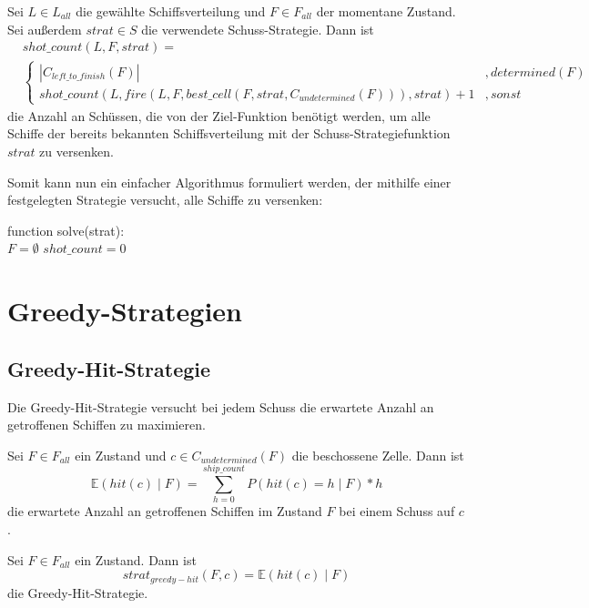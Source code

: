 \documentclass[a4paper,12pt]{llncs}
\numberwithin{equation}{section}
\begin{document}
\begin{definition}
Sei $L\in L_{all}$ die gewählte Schiffsverteilung und $F\in F_{all}$ der momentane Zustand.
Sei außerdem $strat \in S$ die verwendete Schuss-Strategie.
Dann ist
\begin{align}
&shot\_count(L, F, strat)=\\
& \begin{cases} 
  	|C_{left\_to\_finish}(F)|& ,determined(F) \\
      shot\_count(L, fire(L, F, best\_cell(F, strat, C_{undetermined}(F))), strat) + 1 & ,sonst
   \end{cases}
\nonumber
\end{align}
die Anzahl an Schüssen, die von der Ziel-Funktion benötigt werden, um alle Schiffe der bereits bekannten Schiffsverteilung mit der Schuss-Strategiefunktion $strat$ zu versenken.
\end{definition}

Somit kann nun ein einfacher Algorithmus formuliert werden, der mithilfe einer festgelegten Strategie versucht, alle Schiffe zu versenken:

\begin{algorithm}[H]
 function solve(strat):\\
 $F=\emptyset$\;
 $shot\_count=0$\;
\end{algorithm}

\section{Greedy-Strategien}

\subsection{Greedy-Hit-Strategie}
Die Greedy-Hit-Strategie versucht bei jedem Schuss die erwartete Anzahl an getroffenen Schiffen zu maximieren.

\begin{definition}
Sei $F\in F_{all}$ ein Zustand und $c \in C_{undetermined}(F)$ die beschossene Zelle.
Dann ist
\[
\mathds{E}(hit(c) \mid F)=\sum_{h=0}^{ship\_count} P(hit(c)=h \mid F) * h
\]
die erwartete Anzahl an getroffenen Schiffen im Zustand $F$ bei einem Schuss auf $c$.
\end{definition}

\begin{definition}
Sei $F\in F_{all}$ ein Zustand.
Dann ist
\[
strat_{greedy-hit}(F,c)=\mathds{E}(hit(c) \mid F)
\]
die Greedy-Hit-Strategie.
\end{definition}
\end{document}
